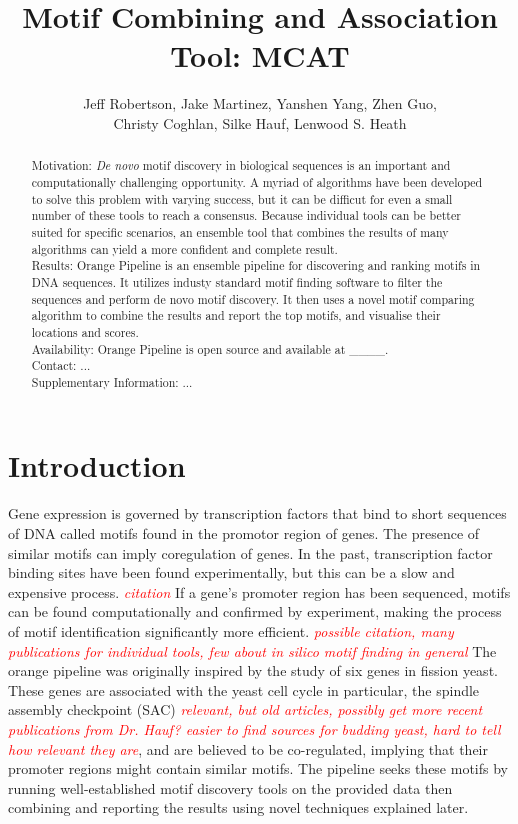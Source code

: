 \documentclass[12pt]{article}
\title{Motif Combining and Association Tool: MCAT}
\author{Jeff Robertson, Jake Martinez, Yanshen Yang, Zhen Guo,\\
Christy Coghlan, Silke Hauf, Lenwood S. Heath}
\newcommand{\comment}[1]{\textcolor{red}{\it{#1}}}
\begin{document}
\maketitle

\begin{abstract}
\label{section:abstract}
\noindent
Motivation:
\textit{De novo} motif discovery in biological sequences is an important and
computationally challenging opportunity.
A myriad of algorithms have been developed to solve this problem with varying
success, but it can be difficut for even a small number of these tools to reach
a consensus.
Because individual tools can be better suited for specific scenarios,
an ensemble tool that
combines the results of many algorithms can yield a more confident and complete
result.\\
Results:
Orange Pipeline is an ensemble pipeline for discovering and ranking motifs in
DNA sequences.
It utilizes industy standard motif finding software to filter the sequences
and perform de novo motif discovery.
It then uses a novel motif comparing algorithm to combine the results and report
the top motifs, and visualise their locations and scores.\\
Availability: Orange Pipeline is open source and available at \_\_\_\_.\\
Contact: ...\\
Supplementary Information: ...
\end{abstract}

\section{Introduction}
\label{section:introduction}
Gene expression is governed by transcription factors that bind to short
sequences of DNA called motifs found in the promotor region of genes. %
The presence of similar motifs can imply coregulation of genes.
In the past, transcription factor binding sites have been found experimentally,
but this can be a slow and expensive process. \comment{citation}
If a gene's promoter region has been sequenced, motifs can be found
computationally and confirmed by experiment, making the process of motif
identification significantly more efficient. \comment{possible citation,
    many publications for individual tools, few about \it{in silico} motif
finding in general}
The orange pipeline was originally inspired by the study of six genes in
fission yeast.%
These genes are associated with the yeast cell cycle
in particular, 
the spindle assembly checkpoint (SAC)
\cite{He22071997}\cite{Kim1045}
\comment{relevant, but old articles, possibly get more recent publications
from Dr. Hauf? easier to find sources for budding yeast, hard to tell
how relevant they are}, 
and are believed to be co-regulated,
implying that their promoter regions might contain similar motifs.
The pipeline seeks these motifs by running well-established motif
discovery tools on the provided data then combining and reporting the results
using novel techniques explained later.
\end{document}
